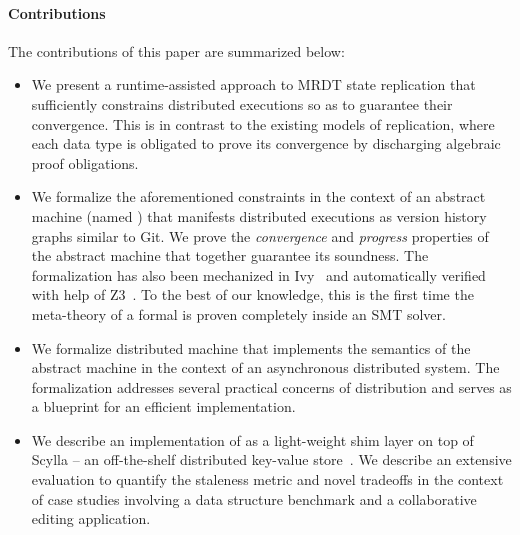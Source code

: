 \paragraph{Contributions} The contributions of this paper are summarized
below:
\begin{itemize}
  \item We present a runtime-assisted approach to MRDT state
    replication that sufficiently constrains distributed executions so
    as to guarantee their convergence. This is in contrast to the
    existing models of replication, where each data type is obligated
    to prove its convergence by discharging algebraic proof
    obligations.

  \item We formalize the aforementioned constraints in the context of
    an abstract machine (named \quark) that manifests distributed
    executions as version history graphs similar to Git.  We prove the
    \emph{convergence} and \emph{progress} properties of the \quark
    abstract machine that together guarantee its soundness. The
    formalization has also been mechanized in Ivy~\cite{ivy} and
    automatically verified with help of Z3~\cite{z3}. To the best of
    our knowledge, this is the first time the meta-theory of a formal
    is proven completely inside an SMT solver.

  \item We formalize \quark distributed machine that implements the
    semantics of the \quark abstract machine in the context of an
    asynchronous distributed system. The formalization addresses
    several practical concerns of distribution and serves as a
    blueprint for an efficient implementation.

  \item We describe an implementation of \quark as a light-weight shim
    layer on top of Scylla -- an off-the-shelf distributed key-value
    store~\cite{scylla}. We describe an extensive evaluation to
    quantify the staleness metric and novel tradeoffs in the context
    of case studies involving a data structure benchmark and a
    collaborative editing application. 
\end{itemize}

